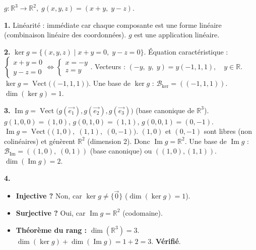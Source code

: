 \documentclass[11pt]{article}
\newcommand{\cle}[1]{{\popxbold\color{popdark}#1}}
\begin{document}
\begin{corrige}
$g:\mathbb{R}^3\to\mathbb{R}^2,\; g(x,y,z)=(x+y,\;y-z)$.

\textbf{1.} Linéarité : immédiate car chaque composante est une forme linéaire (combinaison linéaire des coordonnées). $g$ est une application linéaire.

\textbf{2.} $\ker g = \{(x,y,z)\mid x+y=0,\; y-z=0\}$.
\cle{Équation caractéristique} : $\begin{cases} x+y=0 \\ y-z=0 \end{cases} \iff \begin{cases} x=-y \\ z=y \end{cases}$.
Vecteurs : $(-y,\;y,\;y) = y(-1,1,1),\quad y\in\mathbb{R}$.
$\ker g = \operatorname{Vect}\big((-1,1,1)\big)$.
Une base de $\ker g$ : $\boxed{\mathcal{B}_{\ker}=((-1,1,1))}$. $\dim(\ker g)=1$.

\textbf{3.} $\operatorname{Im} g = \operatorname{Vect}\big(g(\vec{e_1}), g(\vec{e_2}), g(\vec{e_3})\big)$ (base canonique de $\mathbb{R}^3$).
$g(1,0,0)=(1,0)$, $g(0,1,0)=(1,1)$, $g(0,0,1)=(0,-1)$.
$\operatorname{Im} g = \operatorname{Vect}\big((1,0),\;(1,1),\;(0,-1)\big)$.
$(1,0)$ et $(0,-1)$ sont libres (non colinéaires) et génèrent $\mathbb{R}^2$ (dimension 2).
Donc $\operatorname{Im} g = \mathbb{R}^2$.
Une base de $\operatorname{Im} g$ : $\boxed{\mathcal{B}_{\operatorname{Im}}=((1,0),\;(0,1))}$ (base canonique) ou $((1,0),(1,1))$. $\dim(\operatorname{Im} g)=2$.

\textbf{4.}
\begin{itemize}
    \item \textbf{Injective ?} Non, car $\ker g \neq \{\vec{0}\}$ ($\dim(\ker g)=1$).
    \item \textbf{Surjective ?} Oui, car $\operatorname{Im} g = \mathbb{R}^2$ (codomaine).
    \item \textbf{Théorème du rang :} $\dim(\mathbb{R}^3) = 3$. $\dim(\ker g) + \dim(\operatorname{Im} g) = 1 + 2 = 3$. \textbf{Vérifié}.
\end{itemize}
\end{corrige}
\end{document}
